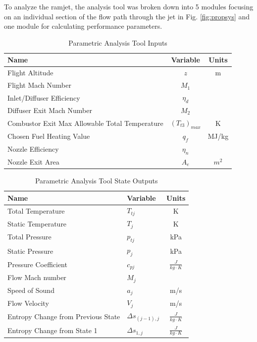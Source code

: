 \documentclass[conf]{new-aiaa} %
\begin{document}
To analyze the ramjet, the analysis tool was broken down into 5 modules focusing on an individual section of the flow path through the jet in Fig. \ref{fig:propsys} and one module for calculating performance parameters.

\begin{table}[hbt!] %
    \caption{\label{tab:tool_inputs} Parametric Analysis Tool Inputs}
    \centering
    \begin{tabular}{lcc}
        \hline
        Name& Variable& Units\\\hline
        Flight Altitude& $z$& m\\
        Flight Mach Number& $M_1$\\
        Inlet/Diffuser Efficiency& $\eta_d$\\
        Diffuser Exit Mach Number& $M_2$\\
        Combustor Exit Max Allowable Total Temperature& $(T_{t3})_{max}$& K\\
        Chosen Fuel Heating Value& $q_f$& MJ/kg\\
        Nozzle Efficiency& $\eta_n$\\
        Nozzle Exit Area& $A_e$& $m^2$\\
        \hline
    \end{tabular}
\end{table}

\begin{table}[hbt!] %
    \caption{\label{tab:state_outputs} Parametric Analysis Tool State Outputs}
    \centering
    \begin{tabular}{llc}
        \hline
        Name& Variable& Units\\\hline
        Total Temperature& $T_{tj}$& K\\
        Static Temperature& $T_{j}$& K\\
        Total Pressure& $p_{tj}$& kPa\\
        Static Pressure& $p_j$& kPa\\
        Pressure Coefficient& $c_{pj}$& $\frac{J}{kg\cdot K}$\\
        Flow Mach number& $M_j$\\
        Speed of Sound& $a_j$& m/s\\
        Flow Velocity& $V_j$& m/s\\
        Entropy Change from Previous State& $\Delta s_{(j-1),j}$& $\frac{J}{kg\cdot K}$\\
        Entropy Change from State 1& $\Delta s_{1,j}$& $\frac{J}{kg\cdot K}$\\
        \hline
    \end{tabular}
\end{table}
\end{document}
